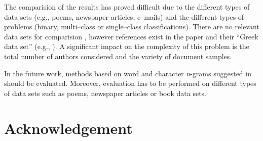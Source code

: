 \documentclass[11pt,english]{article}
\begin{document}
\begin{multicols}{2}
The comparision of the results has proved difficult due to the different types of data sets (e.g., poems,
newspaper articles, e--mails) and the different types of problems (binary, multi--class or
single--class classifications). There are no relevant data sets for comparision
\citep{zhao2005effective}, however references exist in the paper
\citep{stamatatos2001computer} and their ``Greek data set'' (e.g.,
\citep{keselj2003n}). A significant impact on the complexity of this problem 
is the total number of authors considered and the variety of document samples.

In the future work, methods based on word and character \emph{n}-grams suggested
in \citep{keselj2003n,peng2003language,coyotl2006authorship} should be
evaluated. Moreover, evaluation has to be performed on different types of data sets
such as poems, newspaper articles or book data sets.

\section*{Acknowledgement}




\end{multicols}
\end{document}
